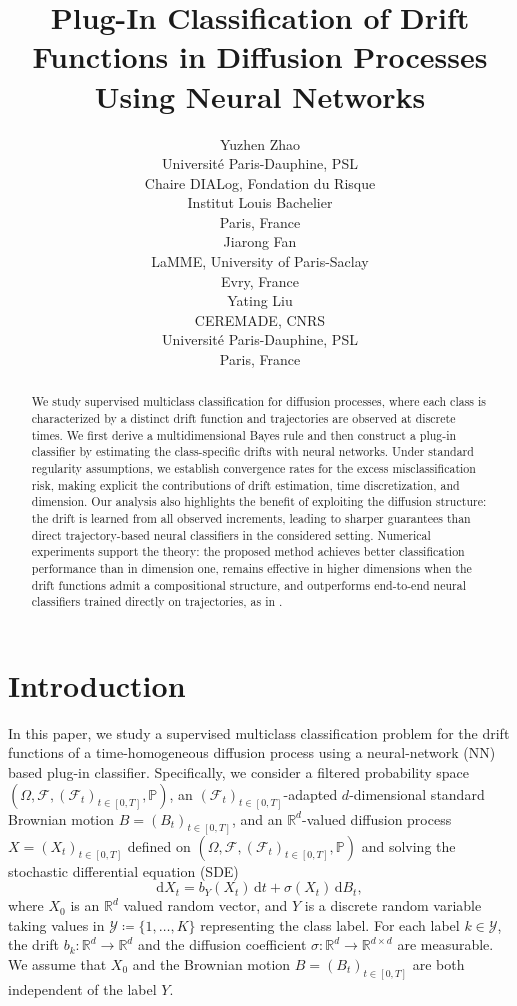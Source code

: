 \documentclass{article}
\title{Plug-In Classification of Drift Functions in Diffusion Processes Using Neural Networks}
\author{%
}
\author{%
  Yuzhen Zhao \\
  Universit\'e Paris-Dauphine, PSL \\
  Chaire DIALog, Fondation du Risque \\
  Institut Louis Bachelier \\
  Paris, France \\
  \And
  Jiarong Fan \\
  LaMME, University of Paris-Saclay \\
  Evry, France \\
  \And
  Yating Liu \\
  CEREMADE, CNRS \\
  Universit\'e Paris-Dauphine, PSL \\
  Paris, France \\
}
\theoremstyle{plain}
\theoremstyle{definition}
\theoremstyle{remark}
\renewcommand{\d}{\mathrm{d}}
\newcommand{\PP}{\mathbb{P}}
\newcommand{\RD}{\mathbb{R}^{d}}
\newcommand{\calF}{\mathcal{F}}
\begin{document}
\maketitle


\begin{abstract}
We study supervised multiclass classification for diffusion processes, where each class is characterized by a distinct drift function and trajectories are observed at discrete times. We first derive a multidimensional Bayes rule and then construct a plug-in classifier by estimating the class-specific drifts with neural networks. Under standard regularity assumptions, we establish convergence rates for the excess misclassification risk, making explicit the contributions of drift estimation, time discretization, and dimension. Our analysis also highlights the benefit of exploiting the diffusion structure: the drift is learned from all observed increments, leading to sharper guarantees than direct trajectory-based neural classifiers in the considered setting. Numerical experiments support the theory: the proposed method achieves better classification performance than \cite{Denis2024} in dimension one, remains effective in higher dimensions when the drift functions admit a compositional structure, and outperforms end-to-end neural classifiers trained directly on trajectories, as in \cite{bos2022}.
\end{abstract}



\section{Introduction}


In this paper, we study a supervised multiclass classification problem for the drift functions of a time-homogeneous diffusion process using a neural-network (NN) based plug-in classifier. Specifically, we consider a filtered probability space $(\Omega, \calF, (\calF_t)_{t\in[0,T]}, \PP)$, an $(\calF_t)_{t\in[0,T]}$-adapted $d$-dimensional standard Brownian motion  $B = (B_t)_{t \in [0, T]}$, and an $\mathbb{R}^d$-valued diffusion process $X=(X_t)_{t\in[0,T]}$ defined on $(\Omega, \calF, (\calF_t)_{t\in[0,T]}, \PP)$ and solving the stochastic differential equation (SDE)
\begin{equation}\label{eq:sde}
\d X_t = b_Y(X_t)\,\d t + \sigma(X_t)\,\d B_t,
\end{equation}
where $X_0$ is an $\RD$ valued random vector, and $Y$ is a discrete random variable taking values in $\mathcal{Y}\coloneqq\{1,\dots,K\}$ representing the class label. For each label $k\in\mathcal{Y}$, the drift $b_k : \mathbb{R}^d \to \mathbb{R}^d$ and the diffusion coefficient $\sigma : \mathbb{R}^d \to \mathbb{R}^{d\times d}$ are measurable. We assume that  $X_0$ and the Brownian motion $B=(B_t)_{t\in[0,T]}$ are both independent of the label $Y$. 
\end{document}
